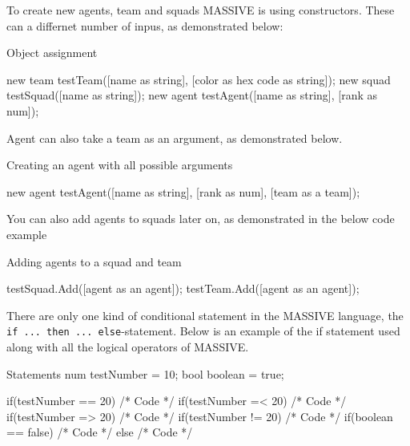 To create new agents, team and squads MASSIVE is using constructors. These can a differnet number of inpus, as demonstrated below:
\begin{source}{Object assignment}{}

new team testTeam([name as string], [color as hex code as string]);
new squad testSquad([name as string]);
new agent testAgent([name as string], [rank as num]);

\end{source}

Agent can also take a team as an argument, as demonstrated below.
\begin{source}{Creating an agent with all possible arguments}{}

new agent testAgent([name as string], [rank as num], [team as a team]);

\end{source}

You can also add agents to squads later on, as demonstrated in the below code example
\begin{source}{Adding agents to a squad and team}{}

testSquad.Add([agent as an agent]);
testTeam.Add([agent as an agent]);

\end{source}

There are only one kind of conditional statement in the MASSIVE language, the \texttt{if ... then ... else}-statement. Below is an example of the if statement used along with all the logical operators of MASSIVE.

\begin{source}{Statements}{}
num testNumber = 10;
bool boolean = true;

if(testNumber == 20)
{
		/* Code */
}
if(testNumber =< 20)
{
		/* Code */
}
if(testNumber => 20)
{
		/* Code */
}
if(testNumber != 20)
{
		/* Code */
}
if(boolean == false)
{
		/* Code */
}
else
{
		/* Code */
}
\end{source}